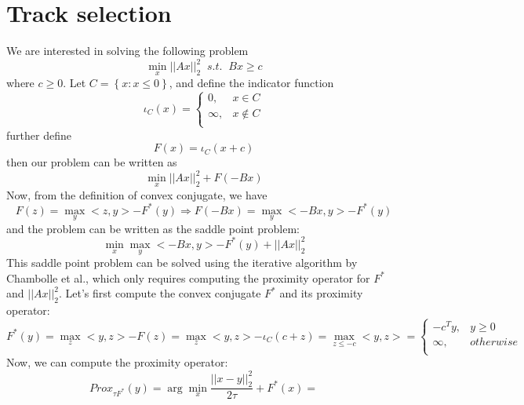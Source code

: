 \documentclass[12pt,draftcls, onecolumn, letterpaper,compsoc]{IEEEtran}
\begin{document}
\section{Track selection}
We are interested in solving the following problem
\begin{equation}
    \min_{x} ||Ax||_{2}^{2} \;\; s.t. \;\; Bx \geq c
\end{equation}
where $c\geq 0$. Let $C=\left\lbrace x: x\leq 0 \right\rbrace$, and define the indicator function
\begin{equation}
    \iota_C(x) =
        \left\lbrace\begin{array}{ll}
            0, & x\in C\\
            \infty, & x\notin C\\
        \end{array}\right.
\end{equation}
further define
\begin{equation}
    F(x) = \iota_{C}(x + c)
\end{equation}
then our problem can be written as
\begin{equation}
    \min_{x} ||Ax||_{2}^{2} +F(-Bx)
\end{equation}
Now, from the definition of convex conjugate, we have
\begin{equation}
    F(z) = \max_{y} <z, y> - F^{*}(y) \Rightarrow F\left(-Bx \right) = \max_{y}<-Bx, y> - F^{*}(y)
\end{equation}
and the problem can be written as the saddle point problem:
\begin{equation}
    \min_{x} \max_{y} <-Bx, y> - F^{*}(y) + ||Ax||_{2}^{2}
\end{equation}
This saddle point problem can be solved using the iterative algorithm by Chambolle et al., which only requires computing the proximity operator for $F^{*}$ and $||Ax||_{2}^{2}$. Let's first compute the convex conjugate $F^{*}$ and its proximity operator:
\begin{displaymath}
    F^{*}(y) = \max_{z}<y,z> - F(z) = \max_{z}<y,z> - \iota_{C}(c+z) = \max_{z \leq -c} <y, z> =
    \left\lbrace\begin{array}{ll}
        -c^Ty, & y\geq 0\\
        \infty, & otherwise\\
    \end{array}\right.
\end{displaymath}
Now, we can compute the proximity operator:
\begin{displaymath}
    Prox_{\tau F^{*}}(y) = \arg\min_{x} \frac{||x-y||_{2}^{2}}{2\tau} + F^{*}(x)=
\end{displaymath}
\end{document}
